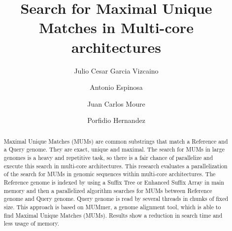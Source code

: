 \documentclass[runningheads,a5paper]{llncs}
\begin{document}
\mainmatter

\title{Search for Maximal Unique Matches in Multi-core architectures}
\author{Julio Cesar Garcia Vizcaino \and Antonio Espinosa \and Juan Carlos Moure \and Porfidio Hernandez }
 

\maketitle
\begin{center}
  \mailsa

  \mailsb
\end{center}

\begin{abstract}
  Maximal Unique Matches (MUMs) are common substrings that match a Reference and a Query genome. They are exact, unique and maximal. The search for MUMs in large genomes is a heavy and repetitive task, so there is a fair chance of parallelize and execute this search in multi-core architectures. This research evaluates a parallelization of the search for MUMs in genomic sequences within multi-core architectures. The Reference genome is indexed by using a Suffix Tree or Enhanced Suffix Array in main memory and then a parallelized algorithm searches for MUMs between Reference genome and Query genome. Query genome is read by several threads in chunks of fixed size. This approach is based on MUMmer, a genome alignment tool, which is able to find Maximal Unique Matches (MUMs). Results show a reduction in search time and less usage of memory.

\end{abstract}
\end{document}
